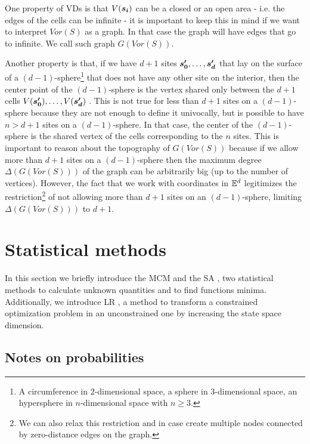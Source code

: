 \documentclass[dissertation.tex]{subfiles}
\begin{document}
One property of \acp{VD} is that $V(\boldsymbol{s_i})$ can be a closed or an
open area - i.e. the edges of the cells can be infinite - it is important
to keep this in mind if we want to interpret $Vor(S)$ as a graph. In
that case the graph will have edges that go to infinite. We call such
graph $G(Vor(S))$.

Another property is that, if we have $d+1$ sites $\boldsymbol{s_0'},\dots,\boldsymbol{s_d'}$ that lay on the
surface of a $(d-1)$-sphere\footnote{A circumference in $2$-dimensional
  space, a sphere in $3$-dimensional space, an hypersphere in
  $n$-dimensional space with $n\ge 3$.} that does not have any other site on
the interior, then the center point of the $(d-1)$-sphere is the
vertex shared only between the $d+1$ cells
$V(\boldsymbol{s_0'}),\dots,V(\boldsymbol{s_d'})$ \cite{deberg}. This is not true for
less than
$d+1$ sites on a
$(d-1)$-sphere because they are not enough to define it univocally,
but is possible to have $n>d+1$ sites on a $(d-1)$-sphere. In that
case, the center of the $(d-1)$-sphere is the shared vertex of the
cells corresponding to the $n$ sites. This is important to reason
about the topography of $G(Vor(S))$ because if we allow more than
$d+1$ sites on a $(d-1)$-sphere then the maximum degree
$\Delta(G(Vor(S)))$ of the graph can be arbitrarily big (up to the
number of vertices). However, the fact that we work with coordinates in
$\mathbb{E}^d$ legitimizes the restriction\footnote{We can also relax this
  restriction and in case create multiple nodes connected by zero-distance
  edges on the graph.} of not
allowing more than $d+1$ sites on an $(d-1)$-sphere, limiting
$\Delta(G(Vor(S)))$ to $d+1$.

\section{Statistical methods}\label{sec:statisticalMethods}
In this section we briefly introduce the \acf{MCM}
\cite{metropolis}\cite{sobol}\cite{newman} and the \acf{SA} \cite{kirkpatrick}\cite{ho},
two statistical methods to calculate unknown quantities and to find
functions minima. Additionally, we introduce \acf{LR} \cite{benjamin}, a
method to transform a constrained optimization problem in an
unconstrained one by increasing the state space
dimension.
\subsection{Notes on probabilities}
\end{document}

